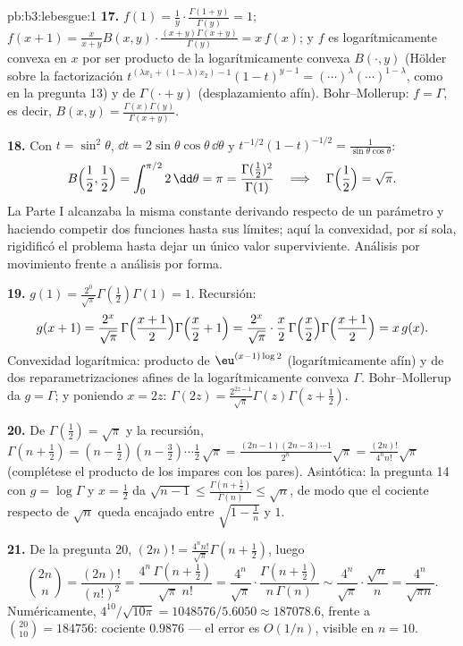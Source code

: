 \begin{solution}{pb:b3:lebesgue:1}
\textbf{17.} $f(1) = \frac1y\cdot\frac{\Gamma(1+y)}{\Gamma(y)}
= 1$; $f(x+1) = \frac{x}{x+y}B(x,y)\cdot\frac{(x+y)\Gamma(x+y)}
{\Gamma(y)} = x\,f(x)$; y $f$ es logarítmicamente convexa en $x$ por ser
producto de la logarítmicamente convexa $B(\cdot, y)$ (Hölder sobre la
factorización $t^{(\lambda x_1 + (1-\lambda)x_2)-1}(1-t)^{y-1}
= (\cdots)^\lambda(\cdots)^{1-\lambda}$, como en la pregunta 13) y de
$\Gamma(\cdot + y)$ (desplazamiento afín). Bohr--Mollerup: $f =
\Gamma$, es decir, $B(x, y) =
\frac{\Gamma(x)\Gamma(y)}{\Gamma(x+y)}$.

\textbf{18.} Con $t = \sin^2\theta$, $\dd t =
2\sin\theta\cos\theta\,\dd\theta$ y $t^{-1/2}(1-t)^{-1/2} =
\frac1{\sin\theta\cos\theta}$:
\[
B\Bigl(\frac12, \frac12\Bigr) =
\int_0^{\pi/2}2\,\dd\theta = \pi
= \frac{\Gamma(\frac12)^2}{\Gamma(1)}
\quad\Longrightarrow\quad
\Gamma\Bigl(\frac12\Bigr) = \sqrt\pi .
\]
La Parte I alcanzaba la misma constante derivando respecto de un
parámetro y haciendo competir dos funciones hasta sus límites; aquí la
convexidad, por sí sola, rigidificó el problema hasta dejar un único
valor superviviente. Análisis por movimiento frente a análisis por
forma.

\textbf{19.} $g(1) = \frac{2^0}{\sqrt\pi}\Gamma(\frac12)
\Gamma(1) = 1$. Recursión:
\[
g(x+1) = \frac{2^{x}}{\sqrt\pi}\,
\Gamma\Bigl(\frac{x+1}2\Bigr)\Gamma\Bigl(\frac x2 + 1\Bigr)
= \frac{2^{x}}{\sqrt\pi}\cdot\frac x2\,
\Gamma\Bigl(\frac x2\Bigr)\Gamma\Bigl(\frac{x+1}2\Bigr)
= x\,g(x) .
\]
Convexidad logarítmica: producto de $\eu^{(x-1)\log2}$ (logarítmicamente
afín) y de dos reparametrizaciones afines de la logarítmicamente convexa
$\Gamma$. Bohr--Mollerup da $g = \Gamma$; y poniendo $x = 2z$:
$\Gamma(2z) = \frac{2^{2z-1}}{\sqrt\pi}\Gamma(z)\Gamma(z +
\frac12)$.

\textbf{20.} De $\Gamma(\frac12) = \sqrt\pi$ y la recursión,
$\Gamma(n + \frac12) = (n - \frac12)(n -
\frac32)\cdots\frac12\,\sqrt\pi =
\frac{(2n-1)(2n-3)\cdots1}{2^n}\sqrt\pi =
\frac{(2n)!}{4^nn!}\sqrt\pi$
(complétese el producto de los
impares con los pares). Asintótica: la pregunta 14 con $g = \log\Gamma$
y $x = \frac12$ da $\sqrt{n-1} \leq
\frac{\Gamma(n+\frac12)}{\Gamma(n)} \leq \sqrt n$, de modo que el
cociente respecto de $\sqrt n$ queda encajado entre $\sqrt{1 - \frac1n}$
y $1$.

\textbf{21.} De la pregunta 20, $(2n)! =
\frac{4^nn!}{\sqrt\pi}\Gamma(n + \tfrac12)$, luego
\[
\binom{2n}n = \frac{(2n)!}{(n!)^2}
= \frac{4^n\,\Gamma(n+\frac12)}{\sqrt\pi\;n!}
= \frac{4^n}{\sqrt\pi}\cdot
\frac{\Gamma(n+\frac12)}{n\,\Gamma(n)}
\sim \frac{4^n}{\sqrt\pi}\cdot\frac{\sqrt n}{n}
= \frac{4^n}{\sqrt{\pi n}} .
\]
Numéricamente, $4^{10}/\sqrt{10\pi} = 1048576/5.6050 \approx
187078.6$, frente a $\binom{20}{10} = 184756$: cociente $0.9876$ --- el
error es $O(1/n)$, visible en $n = 10$.


\end{solution}
